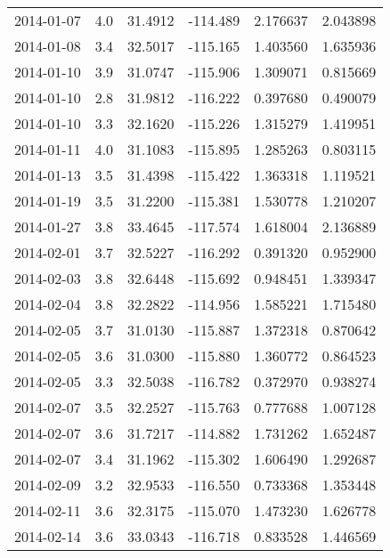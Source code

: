 \begin{tabular}{lrrrrr}
2014-01-07 &       4.0 &  31.4912 &  -114.489 &         2.176637 &         2.043898 \\
2014-01-08 &       3.4 &  32.5017 &  -115.165 &         1.403560 &         1.635936 \\
2014-01-10 &       3.9 &  31.0747 &  -115.906 &         1.309071 &         0.815669 \\
2014-01-10 &       2.8 &  31.9812 &  -116.222 &         0.397680 &         0.490079 \\
2014-01-10 &       3.3 &  32.1620 &  -115.226 &         1.315279 &         1.419951 \\
2014-01-11 &       4.0 &  31.1083 &  -115.895 &         1.285263 &         0.803115 \\
2014-01-13 &       3.5 &  31.4398 &  -115.422 &         1.363318 &         1.119521 \\
2014-01-19 &       3.5 &  31.2200 &  -115.381 &         1.530778 &         1.210207 \\
2014-01-27 &       3.8 &  33.4645 &  -117.574 &         1.618004 &         2.136889 \\
2014-02-01 &       3.7 &  32.5227 &  -116.292 &         0.391320 &         0.952900 \\
2014-02-03 &       3.8 &  32.6448 &  -115.692 &         0.948451 &         1.339347 \\
2014-02-04 &       3.8 &  32.2822 &  -114.956 &         1.585221 &         1.715480 \\
2014-02-05 &       3.7 &  31.0130 &  -115.887 &         1.372318 &         0.870642 \\
2014-02-05 &       3.6 &  31.0300 &  -115.880 &         1.360772 &         0.864523 \\
2014-02-05 &       3.3 &  32.5038 &  -116.782 &         0.372970 &         0.938274 \\
2014-02-07 &       3.5 &  32.2527 &  -115.763 &         0.777688 &         1.007128 \\
2014-02-07 &       3.6 &  31.7217 &  -114.882 &         1.731262 &         1.652487 \\
2014-02-07 &       3.4 &  31.1962 &  -115.302 &         1.606490 &         1.292687 \\
2014-02-09 &       3.2 &  32.9533 &  -116.550 &         0.733368 &         1.353448 \\
2014-02-11 &       3.6 &  32.3175 &  -115.070 &         1.473230 &         1.626778 \\
2014-02-14 &       3.6 &  33.0343 &  -116.718 &         0.833528 &         1.446569 \\

\end{tabular}
